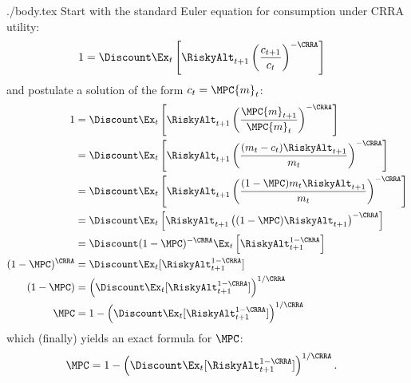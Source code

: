 \documentclass{handout}
\begin{document}
\begin{verbatimwrite}{./body.tex}
Start with the standard Euler equation for consumption under CRRA utility:
\begin{equation}\begin{gathered}\begin{aligned}
        1 & =  \Discount  
        \Ex_{t}\left[\RiskyAlt_{t+1}\left(\frac{c_{t+1}}{c_{t}}\right)^{-\CRRA}\right]
\end{aligned}\end{gathered}\end{equation}
and postulate a solution of the form $c_{t} = \MPC {m}_{t}$: 
\begin{equation}\begin{gathered}\begin{aligned}
        1 & =  \Discount  \Ex_{t}\left[\RiskyAlt_{t+1}\left(\frac{\MPC {m}_{t+1}}{\MPC {m}_{t}}\right)^{-\CRRA}\right]  \notag \\
         & =  \Discount  \Ex_{t}\left[\RiskyAlt_{t+1}\left(\frac{({m}_{t}-c_{t})\RiskyAlt_{t+1}}{ {m}_{t}}\right)^{-\CRRA}\right]  \notag \\
         & =  \Discount  \Ex_{t}\left[\RiskyAlt_{t+1}\left(\frac{(1-\MPC){m}_{t}\RiskyAlt_{t+1}}{ {m}_{t}}\right)^{-\CRRA}\right]  \label{eq:onlyx} \notag \\
         & =  \Discount  \Ex_{t}\left[\RiskyAlt_{t+1}\left((1-\MPC)\RiskyAlt_{t+1}\right)^{-\CRRA}\right]  \notag \\         
         & =  \Discount  (1-\MPC)^{-\CRRA}\Ex_{t}\left[\RiskyAlt_{t+1}^{1-\CRRA}\right]  
\notag \\ (1-\MPC)^{\CRRA} & =  \Discount  \Ex_{t}[\RiskyAlt_{t+1}^{1-\CRRA}]        
\notag \\ (1-\MPC) & =  \left(\Discount  \Ex_{t}[\RiskyAlt_{t+1}^{1-\CRRA}]\right)^{1/\CRRA} \notag
\\  \MPC & =  1- \left(\Discount  \Ex_{t}[\RiskyAlt_{t+1}^{1-\CRRA}]\right)^{1/\CRRA} 
\end{aligned}\end{gathered}\end{equation}
which (finally) yields an exact formula for $\MPC$:
\begin{equation}\begin{gathered}\begin{aligned}
  \MPC & =  1- \left(\Discount  \Ex_{t}[\RiskyAlt_{t+1}^{1-\CRRA}]\right)^{1/\CRRA} \label{eq:MPCExact}.
\end{aligned}\end{gathered}\end{equation}



\end{verbatimwrite}
\end{document}

